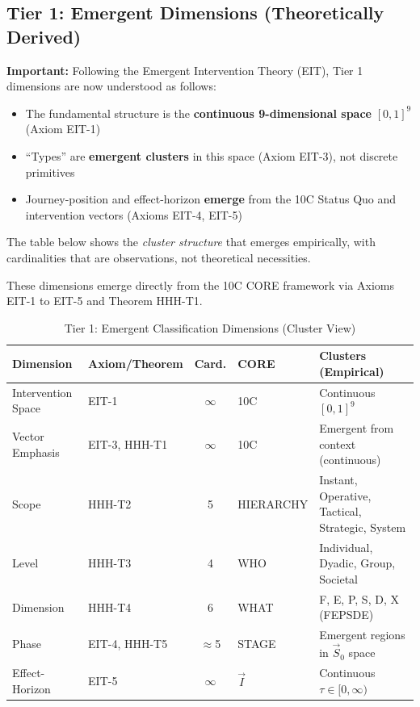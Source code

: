 \subsection{Tier 1: Emergent Dimensions (Theoretically Derived)}

\begin{tcolorbox}[colback=red!5!white, colframe=red!75!black,
    title=\textbf{v2.0 Update: Continuous Space Paradigm}]
\textbf{Important:} Following the Emergent Intervention Theory (EIT), Tier 1 dimensions are now understood as follows:
\begin{itemize}[nosep]
    \item The fundamental structure is the \textbf{continuous 9-dimensional space} $[0,1]^9$ (Axiom EIT-1)
    \item ``Types'' are \textbf{emergent clusters} in this space (Axiom EIT-3), not discrete primitives
    \item Journey-position and effect-horizon \textbf{emerge} from the 10C Status Quo and intervention vectors (Axioms EIT-4, EIT-5)
\end{itemize}
The table below shows the \textit{cluster structure} that emerges empirically, with cardinalities that are observations, not theoretical necessities.
\end{tcolorbox}

These dimensions emerge directly from the 10C CORE framework via Axioms EIT-1 to EIT-5 and Theorem HHH-T1.

\begin{table}[htbp]
\centering
\caption{Tier 1: Emergent Classification Dimensions (Cluster View)}
\label{tab:hhh-tier1}
\renewcommand{\arraystretch}{1.3}
\small
\begin{tabular}{@{}llclp{4cm}@{}}
\toprule
\textbf{Dimension} & \textbf{Axiom/Theorem} & \textbf{Card.} & \textbf{CORE} & \textbf{Clusters (Empirical)} \\
\midrule
Intervention Space & EIT-1 & $\infty$ & 10C & Continuous $[0,1]^9$ \\
Vector Emphasis & EIT-3, HHH-T1 & $\infty$ & 10C & Emergent from context (continuous) \\
Scope & HHH-T2 & 5 & HIERARCHY & Instant, Operative, Tactical, Strategic, System \\
Level & HHH-T3 & 4 & WHO & Individual, Dyadic, Group, Societal \\
Dimension & HHH-T4 & 6 & WHAT & F, E, P, S, D, X (FEPSDE) \\
Phase & EIT-4, HHH-T5 & $\approx$5 & STAGE & Emergent regions in $\vec{S}_0$ space \\
Effect-Horizon & EIT-5 & $\infty$ & $\vec{I}$ & Continuous $\tau \in [0, \infty)$ \\
\bottomrule
\end{tabular}
\end{table}

